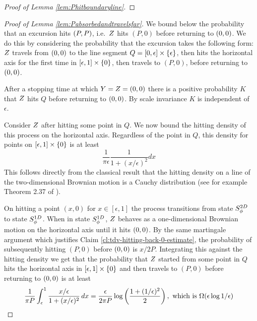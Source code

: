 {{\begin{proof}[Proof of Lemma \ref{lem:Phitboundaryline}]
\end{proof}
}
\begin{proof}[Proof of Lemma \ref{lem:Pabsorbedandtravelsfar}]
\newcommand{\rotfarpoint}{(P,0)}
\newcommand{\segment}{[\epsilon,1] \cross \{0\}}
We bound below the probability that an excursion hits $(P,P)$,
i.e.\ $Z$ hits $\rotfarpoint$ before returning to $(0,0)$.
We do this by considering the probability that the excursion takes
the following form: $Z$ travels from $(0,0)$ to the line
segment $Q = [0, \epsilon] \times \{\epsilon\}$, then hits the horizontal
axis for the first time in $\segment$, then travels to $\rotfarpoint$,
before returning to $(0,0)$.

After a stopping time at which $Y = Z = (0,0)$ there is a positive probability $K$
that $Z$ hits $Q$ before returning to $(0,0)$.
By scale invariance $K$ is independent of $\epsilon$.

Consider $Z$ after hitting some point in $Q$.  We now
bound the hitting density of this process on the horizontal
axis.  Regardless of the point in $Q$, this density for points on
$\segment$ is at least
\[
\frac{1}{\pi\epsilon} \frac{1}{1 + (x/\epsilon)^2} dx
\]
This follows directly from the classical result that the hitting density
on a line of the two-dimensional Brownian motion is a Cauchy distribution
(see for example Theorem 2.37 of \cite{mortens-peres}).

On hitting a point $(x,0)$ for $x \in [\epsilon, 1]$ the process
transitions from state $S^{2D}_{\phi}$ to state $S^{1D}_{\phi}$.
When in state $S^{1D}_{\phi}$, $Z$ behaves as a
one-dimensional Brownian motion on the horizontal axis until it hits
$(0,0)$.
By the same martingale argument which justifies
Claim \ref{cl:tdv-hitting-back-0-estimate}, the
probability of subsequently hitting $\rotfarpoint$ before $(0,0)$ is $x/2P$.
Integrating this against the hitting density we get that the probability that
$Z$ started from some point in $Q$ hits the horizontal axis in $\segment$
and then travels to $\rotfarpoint$ before returning
to $(0,0)$ is at least
\[
\frac{1}{\pi P} \int_{\epsilon}^{1} \frac{x/\epsilon}{1 + (x/\epsilon)^2}
\, dx
=
\frac{\epsilon}{2\pi P} \log\left(\frac{1 + (1/\epsilon)^2}{2}\right)
,\text{ which is }
\Omega(\epsilon\log 1/\epsilon)
\]
\end{proof}
}
